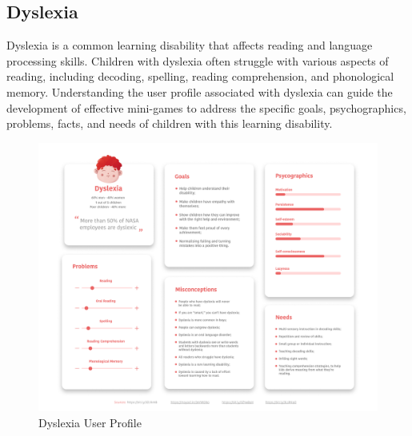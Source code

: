 \subsection{Dyslexia}
Dyslexia is a common learning disability that affects reading and language processing skills. Children with dyslexia often struggle with various aspects of reading, including decoding, spelling, reading comprehension, and phonological memory. Understanding the user profile associated with dyslexia can guide the development of effective mini-games to address the specific goals, psychographics, problems, facts, and needs of children with this learning disability.

\begin{figure}[H]
    \centering
    \includegraphics[width=0.8\linewidth]{Chapters/figma/Dislexia.png}
    \caption{Dyslexia User Profile}
    \label{fig:dyslexiaUserProfile}
\end{figure}

